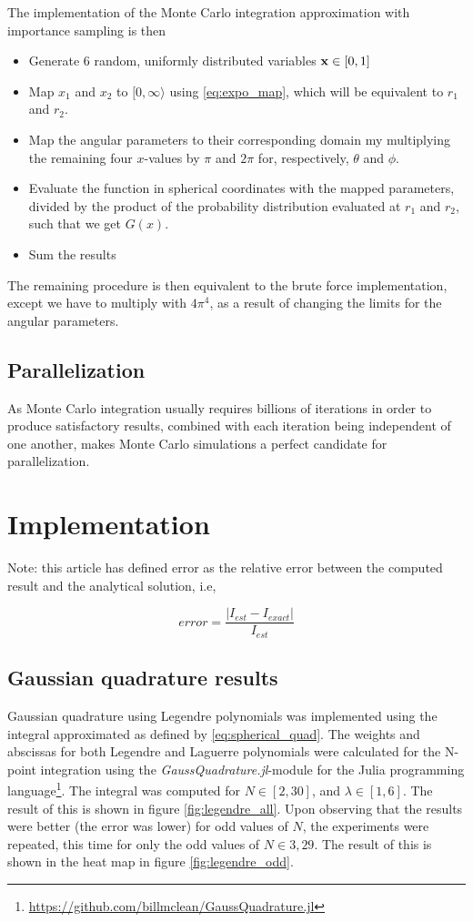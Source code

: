 \documentclass[a4paper,10pt,english]{article}
\begin{document}
The implementation of the Monte Carlo integration approximation with importance sampling is then

\begin{itemize}
    \item Generate 6 random, uniformly distributed variables $\bold{x} \in [0, 1]$
    \item Map $x_1$ and $x_2$ to $[0, \infty \rangle$ using \ref{eq:expo_map}, which will be equivalent to $r_1$ and $r_2$.
    \item Map the angular parameters to their corresponding domain my multiplying the remaining four $x$-values by $\pi$ and $2\pi$ for, respectively, $\theta$ and $\phi$. 
    \item Evaluate the function in spherical coordinates with the mapped parameters, divided by the product of the probability distribution evaluated at $r_1$ and $r_2$, such that we get $G(x)$.
    \item Sum the results
\end{itemize}

The remaining procedure is then equivalent to the brute force implementation, except we have to multiply with $4\pi^4$, as a result of changing the limits for the angular parameters.

\subsection{Parallelization}

As Monte Carlo integration usually requires billions of iterations in order to produce satisfactory results, combined with each iteration being independent of one another, makes Monte Carlo simulations a perfect candidate for parallelization.

\section{Implementation}

Note: this article has defined error as the relative error between the computed result and the analytical solution, i.e,

$$error = \frac{|I_{est} - I_{exact}|}{I_{est}}$$

\subsection{Gaussian quadrature results}

Gaussian quadrature using Legendre polynomials was implemented using the integral approximated as defined by \ref{eq:spherical_quad}. The weights and abscissas for both Legendre and Laguerre polynomials were calculated for the N-point integration using the \textit{GaussQuadrature.jl}-module for the Julia programming language\footnote{\url{https://github.com/billmclean/GaussQuadrature.jl}}. The integral was computed for $N \in [2, 30]$, and $\lambda \in [1, 6]$. The result of this is shown in figure \ref{fig:legendre_all}.  Upon observing that the results were better (the error was lower) for odd values of $N$, the experiments were repeated, this time for only the odd values of $N \in {3, 29}$. The result of this is shown in the heat map in figure \ref{fig:legendre_odd}. 
\end{document}
